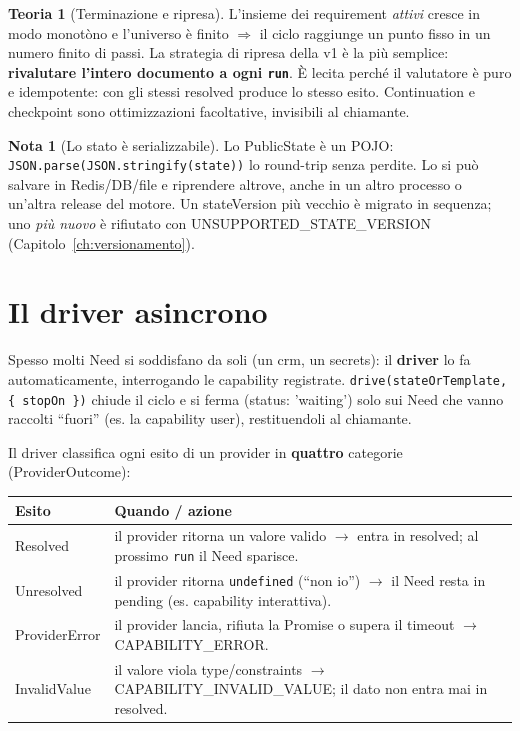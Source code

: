 \documentclass[11pt,a4paper]{book}
\let\code\lstinline
\newcommand{\ic}[1]{{\ttfamily #1}}
\theoremstyle{definition}
\newtheorem*{nota}{Nota}
\newtheorem*{teoria}{Teoria}
\begin{document}
{{{{\begin{teoria}[Terminazione e ripresa]
L'insieme dei requirement \emph{attivi} cresce in modo monotòno e l'universo è
finito $\Rightarrow$ il ciclo raggiunge un punto fisso in un numero finito di passi.
La strategia di ripresa della v1 è la più semplice: \textbf{rivalutare l'intero
documento a ogni \code|run|}. È lecita perché il valutatore è puro e idempotente:
con gli stessi \ic{resolved} produce lo stesso esito. Continuation e checkpoint sono
ottimizzazioni facoltative, invisibili al chiamante.
\end{teoria}

\begin{nota}[Lo stato è serializzabile]
Lo \ic{PublicState} è un POJO: \code|JSON.parse(JSON.stringify(state))| lo
round-trip senza perdite. Lo si può salvare in Redis/DB/file e riprendere altrove,
anche in un altro processo o un'altra release del motore. Un \ic{stateVersion} più
vecchio è migrato in sequenza; uno \emph{più nuovo} è rifiutato con
\ic{UNSUPPORTED\_STATE\_VERSION} (Capitolo~\ref{ch:versionamento}).
\end{nota}

\section{Il driver asincrono}

Spesso molti \ic{Need} si soddisfano da soli (un \ic{crm}, un \ic{secrets}): il
\textbf{driver} lo fa automaticamente, interrogando le capability registrate.
\code|drive(stateOrTemplate, { stopOn })| chiude il ciclo e si ferma
(\ic{status: 'waiting'}) solo sui \ic{Need} che vanno raccolti ``fuori'' (es. la
capability \ic{user}), restituendoli al chiamante.

Il driver classifica ogni esito di un provider in \textbf{quattro} categorie
(\ic{ProviderOutcome}):

\begin{center}
\small
\begin{tabular}{@{}l p{9.6cm}@{}}
\toprule
\textbf{Esito} & \textbf{Quando / azione} \\
\midrule
\ic{Resolved} & il provider ritorna un valore valido $\rightarrow$ entra in
\ic{resolved}; al prossimo \code|run| il Need sparisce. \\
\ic{Unresolved} & il provider ritorna \code|undefined| (``non io'') $\rightarrow$ il
Need resta in \ic{pending} (es. capability interattiva). \\
\ic{ProviderError} & il provider lancia, rifiuta la Promise o supera il timeout
$\rightarrow$ \ic{CAPABILITY\_ERROR}. \\
\ic{InvalidValue} & il valore viola \ic{type}/\ic{constraints} $\rightarrow$
\ic{CAPABILITY\_INVALID\_VALUE}; il dato non entra mai in \ic{resolved}. \\
\bottomrule
\end{tabular}
\end{center}

}}}}
\end{document}
